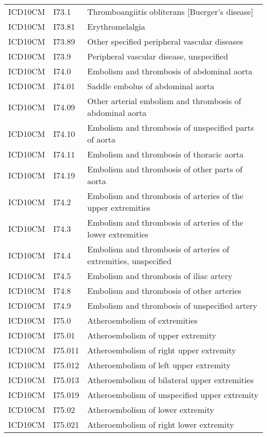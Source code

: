 \begin{longtable}{p{}p{}p{}}
  ICD10CM & I73.1 & Thromboangiitis obliterans [Buerger's disease] \\ 
  ICD10CM & I73.81 & Erythromelalgia \\ 
  ICD10CM & I73.89 & Other specified peripheral vascular diseases \\ 
  ICD10CM & I73.9 & Peripheral vascular disease, unspecified \\ 
  ICD10CM & I74.0 & Embolism and thrombosis of abdominal aorta \\ 
  ICD10CM & I74.01 & Saddle embolus of abdominal aorta \\ 
  ICD10CM & I74.09 & Other arterial embolism and thrombosis of abdominal aorta \\ 
  ICD10CM & I74.10 & Embolism and thrombosis of unspecified parts of aorta \\ 
  ICD10CM & I74.11 & Embolism and thrombosis of thoracic aorta \\ 
  ICD10CM & I74.19 & Embolism and thrombosis of other parts of aorta \\ 
  ICD10CM & I74.2 & Embolism and thrombosis of arteries of the upper extremities \\ 
  ICD10CM & I74.3 & Embolism and thrombosis of arteries of the lower extremities \\ 
  ICD10CM & I74.4 & Embolism and thrombosis of arteries of extremities, unspecified \\ 
  ICD10CM & I74.5 & Embolism and thrombosis of iliac artery \\ 
  ICD10CM & I74.8 & Embolism and thrombosis of other arteries \\ 
  ICD10CM & I74.9 & Embolism and thrombosis of unspecified artery \\ 
  ICD10CM & I75.0 & Atheroembolism of extremities \\ 
  ICD10CM & I75.01 & Atheroembolism of upper extremity \\ 
  ICD10CM & I75.011 & Atheroembolism of right upper extremity \\ 
  ICD10CM & I75.012 & Atheroembolism of left upper extremity \\ 
  ICD10CM & I75.013 & Atheroembolism of bilateral upper extremities \\ 
  ICD10CM & I75.019 & Atheroembolism of unspecified upper extremity \\ 
  ICD10CM & I75.02 & Atheroembolism of lower extremity \\ 
  ICD10CM & I75.021 & Atheroembolism of right lower extremity \\ 

\end{longtable}
